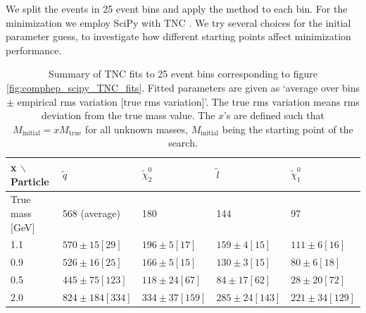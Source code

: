 \documentclass[twoside,english]{uiofysmaster}
\begin{document}
We split the events in 25 event bins and apply the method to each bin. For the minimization we employ {\ttfamily SciPy} \cite{SciPy} with TNC \cite{Nash:1984}. We try several choices for the initial parameter guess, to investigate how different starting points affect minimization performance.

\begin{table}[hbt]
	\centering
	\begin{tabular}{| l | l | l | l | l |}
		\hline 
		x $\backslash$ Particle   			& $\tilde q$ 	&$\tilde \chi_2^0$ 	& $\tilde l$ 	& $\tilde \chi_1^0$    	\\ \hline
		True mass [GeV]     & 568 (average) & 180				& 144			& 97					\\
		1.1 &	$570 \pm 15 [29]$ & $196 \pm 5 [17]$ & $159 \pm 4 [15]$ & $111 \pm 6 [16]$ \\
		0.9 &	$526 \pm 16 [25]$ & $166 \pm 5 [15]$ & $130 \pm 3 [15]$ & $80 \pm 6 [18]$ \\
		0.5 &	$445 \pm 75 [123]$ & $118 \pm 24 [67]$ & $84 \pm 17 [62]$ & $28 \pm 20 [72]$ \\
		2.0 &	$824 \pm 184 [334]$ & $334 \pm 37 [159]$ & $285 \pm 24 [143]$ & $221 \pm 34 [129]$ \\ \hline
	\end{tabular}
	\caption{Summary of TNC fits to 25 event bins corresponding to figure \ref{fig:comphep_scipy_TNC_fits}. Fitted parameters are given as `average over bins $\pm$ empirical rms variation [true rms variation]'. The true rms variation means rms deviation from the true mass value. The $x$'s are defined such that $M_\mathrm{initial}= x M_\mathrm{true}$ for all unknown masses, $M_\mathrm{initial}$ being the starting point of the search.}
	\label{table:comphep_scipy_TNC_fits}
\end{table}
\end{document}
